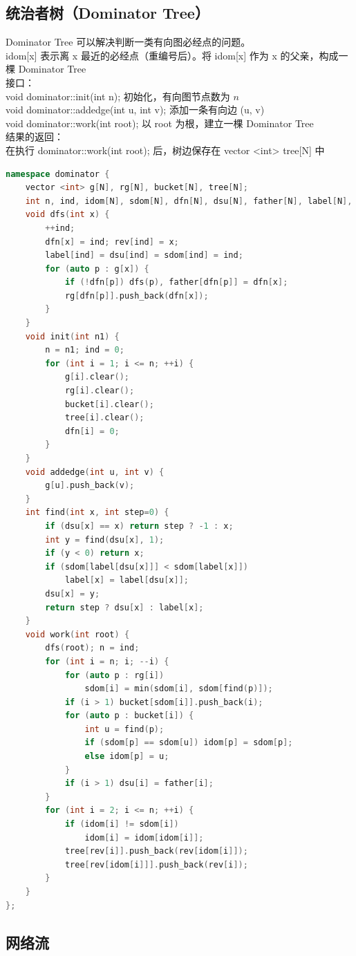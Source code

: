 \documentclass{article}
\begin{document}
\subsection{统治者树（Dominator Tree）}
Dominator Tree 可以解决判断一类有向图必经点的问题。
\\
idom[x] 表示离 x 最近的必经点（重编号后）。将 idom[x] 作为 x 的父亲，构成一棵 Dominator Tree
\\
接口：
\\
void dominator::init(int n); 初始化，有向图节点数为 $n$ 
\\
void dominator::addedge(int u, int v); 添加一条有向边 (u, v)
\\
void dominator::work(int root); 以 root 为根，建立一棵 Dominator Tree 
\\
结果的返回：
\\
在执行 dominator::work(int root); 后，树边保存在 vector <int> tree[N] 中
\begin{lstlisting}[language=C++]
namespace dominator {
	vector <int> g[N], rg[N], bucket[N], tree[N];
	int n, ind, idom[N], sdom[N], dfn[N], dsu[N], father[N], label[N], rev[N];
	void dfs(int x) {
		++ind;
		dfn[x] = ind; rev[ind] = x;
		label[ind] = dsu[ind] = sdom[ind] = ind;
		for (auto p : g[x]) {
			if (!dfn[p]) dfs(p), father[dfn[p]] = dfn[x];
			rg[dfn[p]].push_back(dfn[x]);
		}
	}
	void init(int n1) {
		n = n1; ind = 0;
		for (int i = 1; i <= n; ++i) {
			g[i].clear();
			rg[i].clear();
			bucket[i].clear();
			tree[i].clear();
			dfn[i] = 0;
		}
	}
	void addedge(int u, int v) {
		g[u].push_back(v);
	}
	int find(int x, int step=0) {
		if (dsu[x] == x) return step ? -1 : x;
		int y = find(dsu[x], 1);
		if (y < 0) return x;
		if (sdom[label[dsu[x]]] < sdom[label[x]])
			label[x] = label[dsu[x]];
		dsu[x] = y;
		return step ? dsu[x] : label[x];
	}
	void work(int root) {
		dfs(root); n = ind;
		for (int i = n; i; --i) {
			for (auto p : rg[i])
				sdom[i] = min(sdom[i], sdom[find(p)]);
			if (i > 1) bucket[sdom[i]].push_back(i);
			for (auto p : bucket[i]) {
				int u = find(p);
				if (sdom[p] == sdom[u]) idom[p] = sdom[p];
				else idom[p] = u;
			}
			if (i > 1) dsu[i] = father[i];
		}
		for (int i = 2; i <= n; ++i) {
			if (idom[i] != sdom[i])
				idom[i] = idom[idom[i]];
			tree[rev[i]].push_back(rev[idom[i]]);
			tree[rev[idom[i]]].push_back(rev[i]);
		}
	}
};
\end{lstlisting}
\subsection{网络流}
\end{document}
